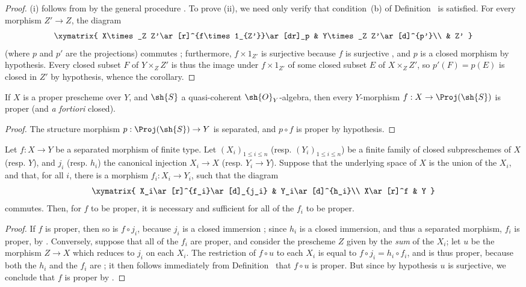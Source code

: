 \begin{proof}
(i) follows from  by the general procedure .
To prove (ii), we need only verify that condition~(b) of Definition~ is satisfied.
For every morphism $Z'\to Z$, the diagram
\[
  \xymatrix{
    X\times_Z Z'\ar[r]^{f\times1_{Z'}}\ar[dr]_p &
    Y\times_Z Z'\ar[d]^{p'}\\
    & Z'
  }
\]
(where $p$ and $p'$ are the projections) commutes ;
furthermore, $f\times1_{Z'}$ is surjective because $f$ is surjective , and $p$ is a closed morphism by hypothesis.
Every closed subset $F$ of $Y\times_Z Z'$ is thus the image under $f\times1_{Z'}$ of some closed subset $E$ of $X\times_Z Z'$, so $p'(F)=p(E)$ is closed in $Z'$ by hypothesis, whence the corollary.
\end{proof}

\begin{corollary}[5.4.4]
\label{II.5.4.4}
If $X$ is a proper prescheme over $Y$, and $\sh{S}$ a quasi-coherent $\sh{O}_Y$-algebra, then every $Y$-morphism $f:X\to\Proj(\sh{S})$ is proper (and \emph{a fortiori} closed).
\end{corollary}

\begin{proof}
The structure morphism $p:\Proj(\sh{S})\to Y$ is separated, and $p\circ f$ is proper by hypothesis.
\end{proof}

\begin{corollary}[5.4.5]
\label{II.5.4.5}
Let $f:X\to Y$ be a separated morphism of finite type.
Let $(X_i)_{1\leq i\leq n}$ (resp. $(Y_i)_{1\leq i\leq n}$) be a finite family of closed subpreschemes of $X$ (resp. $Y$), and $j_i$ (resp. $h_i$) the canonical injection $X_i\to X$ (resp. $Y_i\to Y$).
Suppose that the underlying space of $X$ is the union of the $X_i$, and that, for all $i$, there is a morphism $f_i:X_i\to Y_i$, such that the diagram
\[
  \xymatrix{
    X_i\ar[r]^{f_i}\ar[d]_{j_i} &
    Y_i\ar[d]^{h_i}\\
    X\ar[r]^f &
    Y
  }
\]
commutes.
Then, for $f$ to be proper, it is necessary and sufficient for all of the $f_i$ to be proper.
\end{corollary}

\begin{proof}
If $f$ is proper, then so is $f\circ j_i$, because $j_i$ is a closed immersion ;
since $h_i$ is a closed immersion, and thus a separated morphism, $f_i$ is proper, by .
Conversely, suppose that all of the $f_i$ are proper, and consider the prescheme $Z$ given by the \emph{sum} of the $X_i$; let $u$ be the morphism $Z\to X$ which reduces to $j_i$ on each $X_i$.
The restriction of $f\circ u$ to each $X_i$ is equal to $f\circ j_i=h_i\circ f_i$, and is thus proper, because both the $h_i$ and the $f_i$ are ;
it then follows immediately from Definition~ that $f\circ u$ is proper.
But since by hypothesis $u$ is surjective, we conclude that $f$ is proper by .
\end{proof}

